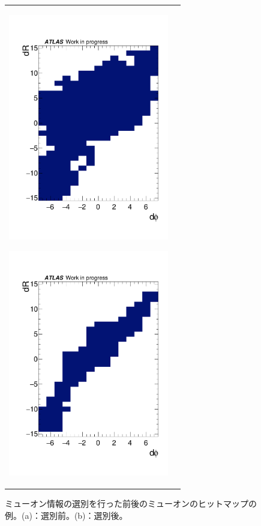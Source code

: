 \begin{figure}[tb]
    \begin{tabular}{cc}
    \centering
    \begin{minipage}[b]{0.45\hsize}%
        \centering
        \hspace*{-1cm}
        \includegraphics[clip, width=7cm]{fig/4/data_phi4_roi53_before.pdf}
        \subcaption{}
        \label{4-53be}
    \end{minipage}%
    \begin{minipage}[b]{0.6\hsize}%
        \centering
        \hspace*{-1cm}
        \includegraphics[clip, width=7cm]{fig/4/data_phi4_roi53_after.pdf}
        \subcaption{}
        \label{4-53af}
    \end{minipage}%
    \end{tabular}
    \caption{ミューオン情報の選別を行った前後のミューオンのヒットマップの例。(a)：選別前。(b)：選別後。}
    \label{Inputdata}
\end{figure}


